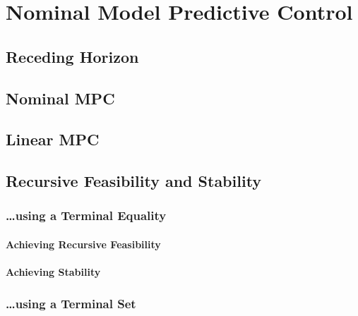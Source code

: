 \chapter{Nominal Model Predictive Control} %
	\label{c:mpcNominal}


    \section{Receding Horizon} %

    \section{Nominal MPC} %

    \section{Linear MPC} %

    \section{Recursive Feasibility and Stability} %

        \subsection{\dots using a Terminal Equality} %

            \subsubsection{Achieving Recursive Feasibility} %

            \subsubsection{Achieving Stability} %

        \subsection{\dots using a Terminal Set} %

